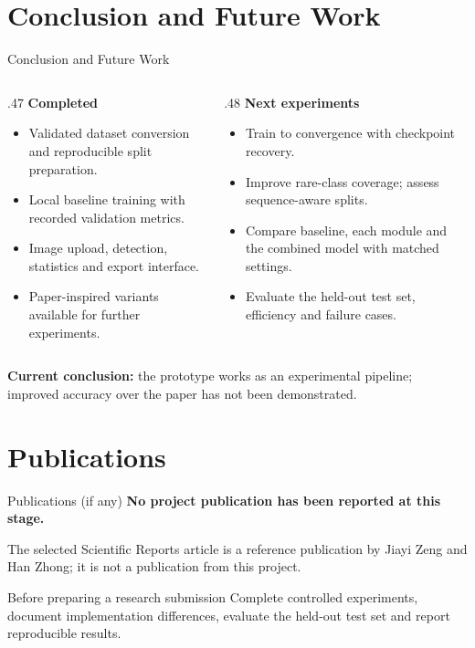 \documentclass[aspectratio=169,11pt]{beamer}
\newcommand{\lead}[1]{{\large\bfseries\color{teal}#1}\par\medskip}
\begin{document}
\section{Conclusion and Future Work}
\begin{frame}{Conclusion and Future Work}\small
\begin{columns}[T]
\begin{column}{.47\textwidth}
\lead{Completed}
\begin{itemize}\setlength\itemsep{3mm}
\item Validated dataset conversion and reproducible split preparation.
\item Local baseline training with recorded validation metrics.
\item Image upload, detection, statistics and export interface.
\item Paper-inspired variants available for further experiments.
\end{itemize}
\end{column}
\begin{column}{.48\textwidth}
\lead{Next experiments}
\begin{itemize}\setlength\itemsep{3mm}
\item Train to convergence with checkpoint recovery.
\item Improve rare-class coverage; assess sequence-aware splits.
\item Compare baseline, each module and the combined model with matched settings.
\item Evaluate the held-out test set, efficiency and failure cases.
\end{itemize}
\end{column}
\end{columns}
\medskip
\textbf{Current conclusion:} the prototype works as an experimental pipeline; improved accuracy over the paper has not been demonstrated.
\end{frame}

\section{Publications}
\begin{frame}{Publications (if any)}
\lead{No project publication has been reported at this stage.}
\bigskip
The selected Scientific Reports article is a reference publication by Jiayi Zeng and Han Zhong; it is not a publication from this project.
\bigskip
\begin{block}{Before preparing a research submission}
Complete controlled experiments, document implementation differences, evaluate the held-out test set and report reproducible results.
\end{block}
\end{frame}
\end{document}
